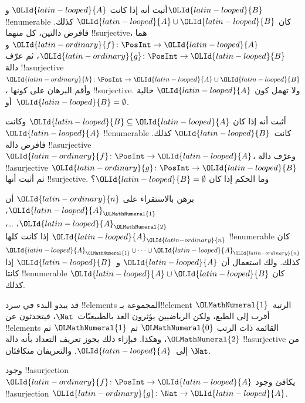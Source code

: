 \documentclass[../../../include/open-logic-section]{subfiles}
\begin{document}
\begin{prob}
أثبت أنه إذا كانت ${\OLId{latin-looped}{A}}$ و${\OLId{latin-looped}{B}}$ !!{enumerable} كان ${\OLId{latin-looped}{A}} \cup {\OLId{latin-looped}{B}}$ كذلك.
فافرض دالتين، كل منهما !!{surjective}، هما ${\OLId{latin-ordinary}{f}}\colon \PosInt \to {\OLId{latin-looped}{A}}$ و${\OLId{latin-ordinary}{g}}\colon \PosInt \to {\OLId{latin-looped}{B}}$،
ثم عرّف دالة !!a{surjective}~${\OLId{latin-ordinary}{h}}\colon \PosInt \to {\OLId{latin-looped}{A}} \cup {\OLId{latin-looped}{B}}$،
وأقم البرهان على كونها !!{surjective}. ولا تهمل كون ${\OLId{latin-looped}{A}}$ خالية
أو~${\OLId{latin-looped}{B}} = \emptyset$.
\end{prob}

\begin{prob}
أثبت أنه إذا كان ${\OLId{latin-looped}{B}} \subseteq {\OLId{latin-looped}{A}}$ وكانت ${\OLId{latin-looped}{A}}$ !!{enumerable} كانت~${\OLId{latin-looped}{B}}$ كذلك.
فافرض دالة !!a{surjective} ${\OLId{latin-ordinary}{f}}\colon \PosInt \to {\OLId{latin-looped}{A}}$،
وعرّف دالة !!a{surjective} ${\OLId{latin-ordinary}{g}}\colon \PosInt \to {\OLId{latin-looped}{B}}$ ثم أثبت أنها
!!{surjective}. وما الحكم إذا كان ${\OLId{latin-looped}{B}} = \emptyset$؟
\end{prob}

\begin{prob}
برهن بالاستقراء على ${\OLId{latin-ordinary}{n}}$ أن ${\OLId{latin-looped}{A}}_{\OLMathNumeral{1}}$، ${\OLId{latin-looped}{A}}_{\OLMathNumeral{2}}$، \dots، ${\OLId{latin-looped}{A}}_{\OLId{latin-ordinary}{n}}$ إذا كانت
كلها !!{enumerable} كان ${\OLId{latin-looped}{A}}_{\OLMathNumeral{1}} \cup \dots \cup {\OLId{latin-looped}{A}}_{\OLId{latin-ordinary}{n}}$ كذلك.
ولك استعمال أن ${\OLId{latin-looped}{A}}$ و~${\OLId{latin-looped}{B}}$ إذا كانتا !!{enumerable} كان ${\OLId{latin-looped}{A}} \cup {\OLId{latin-looped}{B}}$ كذلك.
\end{prob}

قد يبدو البدء في سرد !!{element}s المجموعة بـ!!{element} الرتبة~${\OLMathNumeral{1}}$
أقرب إلى الطبع، ولكن الرياضيين يؤثرون العد بالطبيعيّات~$\Nat$،
فيتحدثون عن !!{element}s القائمة ذات الرتب ${\OLMathNumeral{0}}$ ثم ${\OLMathNumeral{1}}$ ثم ${\OLMathNumeral{2}}$، وهكذا.
فبإزاء ذلك يجوز تعريف التعداد بأنه دالة !!a{surjective} من $\Nat$
إلى~${\OLId{latin-looped}{A}}$. والتعريفان متكافئان.

\begin{prop}
وجود !!a{surjection} ${\OLId{latin-ordinary}{f}}\colon \PosInt \to {\OLId{latin-looped}{A}}$ يكافئ وجود
!!a{surjection} ${\OLId{latin-ordinary}{g}}\colon \Nat \to {\OLId{latin-looped}{A}}$.
\end{prop}
\end{document}
